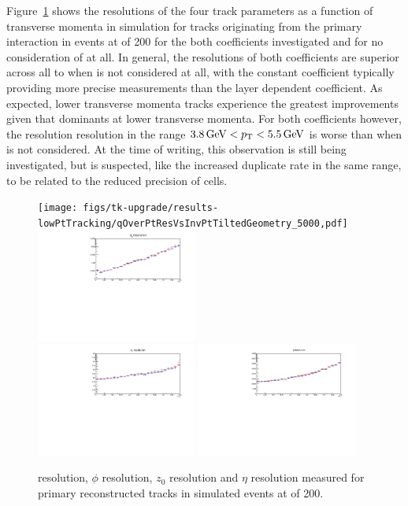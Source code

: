 Figure~\ref{fig:kfHelixParametersResVsInvPt} shows the resolutions of the four track parameters as a function of transverse momenta in simulation for tracks originating from the primary interaction in \ttbar events at \PU of 200 for  the both \MS coefficients investigated and for no consideration of \MS at all.
In general, the resolutions of both \MS coefficients are superior across all \pt to when \MS is not considered at all, with the constant \MS coefficient typically providing more precise measurements than the layer dependent coefficient.  
As expected, lower transverse momenta tracks experience the greatest improvements given that \MS dominants at lower transverse momenta.
For both coefficients however, the \pt resolution resolution in the range $ 3.8 \,\text{Ge\hspace{-.08em}V} < p_{\mathrm{T}} < 5.5\,\text{Ge\hspace{-.08em}V}$ is worse than when \MS is not considered.
At the time of writing, this observation is still being investigated, but is suspected, like the increased duplicate rate in the same \pT range, to be related to the reduced precision of \HT cells.

\begin{figure}[htb]
\centering
\texttt{[image: figs/tk-upgrade/results-lowPtTracking/qOverPtResVsInvPtTiltedGeometry\_5000,pdf]}
\includegraphics[width=0.47\textwidth]{figs/tk-upgrade/results-lowPtTracking/phi0ResVsInvPtTiltedGeometry_5000.pdf}
\\
\includegraphics[width=0.47\textwidth]{figs/tk-upgrade/results-lowPtTracking/z0ResVsInvPtTiltedGeometry_5000.pdf}
\includegraphics[width=0.47\textwidth]{figs/tk-upgrade/results-lowPtTracking/etaResVsInvPtTiltedGeometry_5000.pdf}
\caption{\pt resolution, $\phi$ resolution, $z_{0}$ resolution and $\eta$ resolution measured for primary reconstructed tracks in simulated \ttbar events at \PU of 200.}
\label{fig:kfHelixParametersResVsInvPt}
\end{figure}

